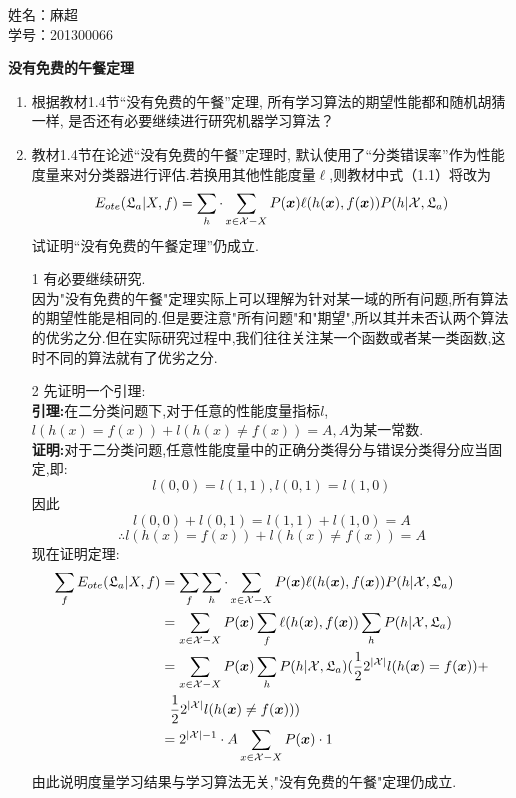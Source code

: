 \documentclass[answers]{exam}  %
\begin{document}
\Large
\noindent
姓名：麻超 \\
学号：201300066 \\
\begin{questions}
	\question [20] \textbf{没有免费的午餐定理}

	\begin{enumerate}
		\item 根据教材1.4节“没有免费的午餐”定理, 所有学习算法的期望性能都和随机胡猜一样, 是否还有必要继续进行研究机器学习算法？
		\item 教材1.4节在论述“没有免费的午餐”定理时, 默认使用了“分类错误率”作为性能度量来对分类器进行评估.若换用其他性能度量$\ell$,则教材中式（1.1）将改为
		      \begin{equation}
			      E_{ote}(\mathfrak{L}_a|X,f)=\sum_h \cdot\sum_{x\in\mathcal{X}-X}P({\boldsymbol{x}})\ell(h({\boldsymbol{x}}),f({\boldsymbol{x}}))P(h|\mathcal{X},\mathfrak{L}_a)
		      \end{equation}
		      试证明“没有免费的午餐定理”仍成立.
	\end{enumerate}
	\begin{solution}
		\begin{enumerate}
			\item[1] 有必要继续研究.\\因为"没有免费的午餐"定理实际上可以理解为针对某一域的所有问题,所有算法的期望性能是相同的.但是要注意"所有问题"和"期望",所以其并未否认两个算法的优劣之分.但在实际研究过程中,我们往往关注某一个函数或者某一类函数,这时不同的算法就有了优劣之分.
			\item[2] 先证明一个引理:\\
			      \textbf{引理:}在二分类问题下,对于任意的性能度量指标$l$,$l(h(x)=f(x))+l(h(x)\neq f(x))=A,A$为某一常数.\\
			      \textbf{证明:}对于二分类问题,任意性能度量中的正确分类得分与错误分类得分应当固定,即:\\
			      $$
				      l(0,0)=l(1,1),l(0,1)=l(1,0)
			      $$
			      因此
			      $$
				      l(0,0)+l(0,1)=l(1,1)+l(1,0)=A
			      $$
			      $$
				      \therefore l(h(x)=f(x))+l(h(x)\neq f(x))=A
			      $$
			      现在证明定理:\\
			      \begin{align*}
				      \sum_f E_{ote}(\mathfrak{L}_a|X,f) & =\sum_f\sum_h \cdot\sum_{x\in\mathcal{X}-X}P({\boldsymbol{x}})\ell(h({\boldsymbol{x}}),f({\boldsymbol{x}}))P(h|\mathcal{X},\mathfrak{L}_a) \\&=\sum_{x\in\mathcal{X}-X}P({\boldsymbol{x}})\sum_f\ell(h({\boldsymbol{x}}),f({\boldsymbol{x}}))\sum_hP(h|\mathcal{X},\mathfrak{L}_a)\\&=\sum_{x\in\mathcal{X}-X}P({\boldsymbol{x}})\sum_hP(h|\mathcal{X},\mathfrak{L}_a)(\frac{1}{2} 2^{|\mathcal X|}l(h({\boldsymbol{x}})=f({\boldsymbol{x}}))+\\& \ \ \frac{1}{2} 2^{|\mathcal X|}l(h({\boldsymbol{x}})\neq f({\boldsymbol{x}})))\\&=2^{|\mathcal X|-1}\cdot A\sum_{x\in\mathcal{X}-X}P({\boldsymbol{x}})\cdot 1
			      \end{align*}
			      由此说明度量学习结果与学习算法无关,"没有免费的午餐"定理仍成立.
		\end{enumerate}
	\end{solution}



\end{questions}
\end{document}
